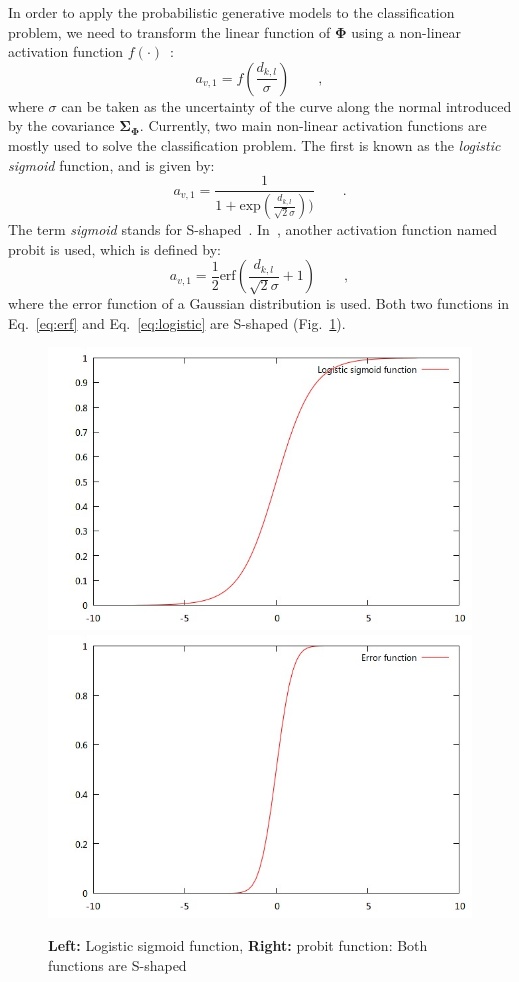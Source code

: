 \documentclass[conference]{IEEEtran}
\begin{document}
In order to apply the probabilistic generative models to the
classification problem,
we need to transform the linear function of $\mathbf{\Phi}$ using a
non-linear activation function $f(\cdot)$~\cite{bishop2006pattern}:
\begin{equation}
  \label{eq:nonla}
  a_{v,1} = f(\frac{d_{k,l}}{\sigma})\qquad,
\end{equation}
where $\sigma$
can be taken as the uncertainty of the curve along the normal
introduced by the covariance $\mathbf{\Sigma}_{\mathbf{\Phi}}$. Currently, two main non-linear activation functions are mostly used
to solve the classification problem. The first is known as the
\textit{logistic sigmoid} function, and is given by:
\begin{equation}
  \label{eq:logistic}
  a_{v,1} =
  \frac{1}{1+\mathrm{exp}(\frac{d_{k,l}}{\sqrt{2}\sigma}))}\qquad .
\end{equation}
The term \textit{sigmoid} stands for
S-shaped~\cite{bishop2006pattern}. In~\cite{hanek2004contracting},
another activation function named probit is used, which is defined by:
\begin{equation}
  \label{eq:erf}
  a_{v,1} = \frac{1}{2}\mathrm{erf}(\frac{d_{k,l}}{\sqrt{2}\sigma} + 1)\qquad ,
\end{equation}
where the error function of a Gaussian distribution is used. Both
two functions in Eq.~\ref{eq:erf} and Eq.~\ref{eq:logistic} are
S-shaped (Fig.~\ref{fig:s-shaped}).
\begin{figure} 
    \centering 
    \includegraphics[width=0.48\columnwidth]{images/logistic.jpg}
    \includegraphics[width=0.48\columnwidth]{images/erf.jpg}
    \caption{\textbf{Left:} Logistic
  sigmoid function, \textbf{Right:} probit function: Both functions
  are S-shaped}
\label{fig:s-shaped}
\end{figure}
\end{document}
